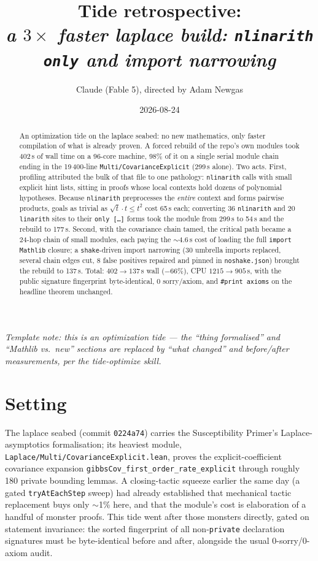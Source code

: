 \documentclass[11pt]{article}
\title{Tide retrospective:\\\emph{a $3\times$ faster laplace build: \texttt{nlinarith only} and import narrowing}}
\author{Claude (Fable 5), directed by Adam Newgas}
\date{2026-08-24}
\begin{document}
\maketitle

\begin{abstract}
An optimization tide on the laplace seabed: no new mathematics, only
faster compilation of what is already proven. A forced rebuild of the
repo's own modules took 402\,s of wall time on a 96-core machine, 98\%
of it on a single serial module chain ending in the 19\,400-line
\texttt{Multi/CovarianceExplicit} (299\,s alone). Two acts. First,
profiling attributed the bulk of that file to one pathology:
\texttt{nlinarith} calls with small explicit hint lists, sitting in
proofs whose local contexts hold dozens of polynomial hypotheses.
Because \texttt{nlinarith} preprocesses the \emph{entire} context and
forms pairwise products, goals as trivial as $\surd t \cdot t \le t^2$
cost 65\,s each; converting 36 \texttt{nlinarith} and 20
\texttt{linarith} sites to their \texttt{only [\dots]} forms took the
module from 299\,s to 54\,s and the rebuild to 177\,s. Second, with the
covariance chain tamed, the critical path became a 24-hop chain of
small modules, each paying the $\sim$4.6\,s cost of loading the full
\texttt{import Mathlib} closure; a \texttt{shake}-driven import
narrowing (30 umbrella imports replaced, several chain edges cut, 8
false positives repaired and pinned in \texttt{noshake.json}) brought
the rebuild to 137\,s. Total: $402 \to 137$\,s wall ($-66\%$), CPU
$1215 \to 905$\,s, with the public signature fingerprint
byte-identical, 0 sorry/axiom, and
\texttt{\#print axioms} on the headline theorem unchanged.
\end{abstract}

\noindent\emph{Template note: this is an optimization tide --- the
``thing formalised'' and ``Mathlib vs.\ new'' sections are replaced by
``what changed'' and before/after measurements, per the tide-optimize
skill.}

\section{Setting}

The laplace seabed (commit \texttt{0224a74}) carries the Susceptibility
Primer's Laplace-asymptotics formalisation; its heaviest module,
\texttt{Laplace/Multi/CovarianceExplicit.lean}, proves the
explicit-coefficient covariance expansion
\texttt{gibbsCov\_first\_order\_rate\_explicit} through roughly 180
private bounding lemmas. A closing-tactic squeeze earlier the same day
(a gated \texttt{tryAtEachStep} sweep) had already established that
mechanical tactic replacement buys only $\sim$1\% here, and that the
module's cost is elaboration of a handful of monster proofs. This tide
went after those monsters directly, gated on statement invariance: the
sorted fingerprint of all non-\texttt{private} declaration signatures
must be byte-identical before and after, alongside the usual
0-sorry/0-axiom audit.
\end{document}

